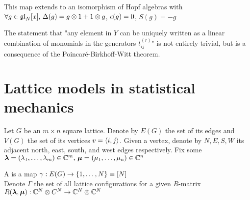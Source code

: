 \documentclass{article}
\begin{document}
\begin{remark}
This map extends to an isomorphism of Hopf algebras with $\forall g \in \mathfrak{gl}_N[x], \, \Delta(g) = g \otimes 1 + 1 \otimes g$, $\epsilon(g) = 0$, $S(g) = -g$
\end{remark}

\begin{remark}
The statement that "any element in $Y$ can be uniquely written as a linear combination of monomials in the generators $t_{ij}^{(r)}$" is not entirely trivial, but is a consequence of the Poincar\'e-Birkhoff-Witt theorem. 
\end{remark}

\section{Lattice models in statistical mechanics}

Let $G$ be an $m \times n$ square lattice. Denote by $E(G)$ the set of its edges and $V(G)$ the set of its vertices $v = \left\langle i,j \right\rangle$. Given a vertex, denote by $N,E,S,W$ its adjacent north, east, south, and west edges respectively. Fix some $\bm{\lambda} = (\lambda_1, \dots, \lambda_m)\in \mathbb{C}^m, \, \bm{\mu} = (\mu_1, \dots, \mu_n)\in \mathbb{C}^n$

\begin{definition}
A  is a map $\gamma : E(G) \to \left\{ 1, \dots, N \right\} \equiv [N]$ \\
Denote $\Gamma$ the set of all lattice configurations for a given $R$-matrix $R(\bm{\lambda},\bm{\mu}) : \mathbb{C}^N \otimes C^N \to \mathbb{C}^N \otimes \mathbb{C}^N$
\end{definition}
\end{document}
